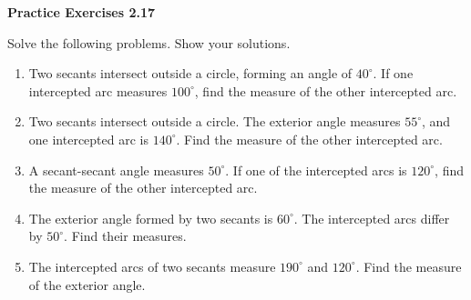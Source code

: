 \vspace{0.3ex}
\noindent\textbf{Practice Exercises 2.17}

\vspace{0.2ex}

Solve the following problems. Show your solutions.

\begin{enumerate}
    \item Two secants intersect outside a circle, forming an angle of $40^\circ$. If one intercepted arc measures $100^\circ$, find the measure of the other intercepted arc.
    \item Two secants intersect outside a circle. The exterior angle measures $55^\circ$, and one intercepted arc is $140^\circ$. Find the measure of the other intercepted arc.
    \item A secant-secant angle measures $50^\circ$. If one of the intercepted arcs is $120^\circ$, find the measure of the other intercepted arc.
    \item The exterior angle formed by two secants is $60^\circ$. The intercepted arcs differ by $50^\circ$. Find their measures.
    \item The intercepted arcs of two secants measure $190^\circ$ and $120^\circ$. Find the measure of the exterior angle.
\end{enumerate}
